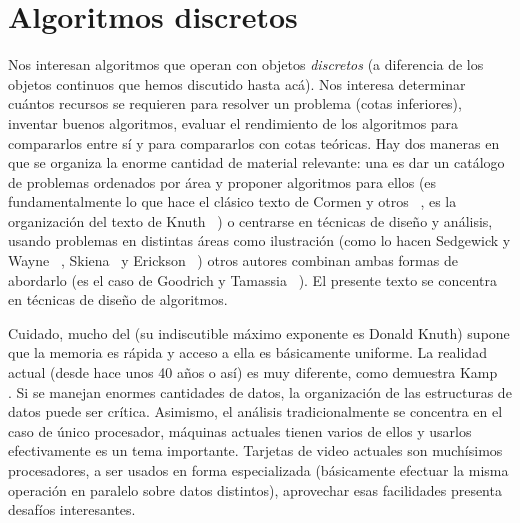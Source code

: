 

\chapter{Algoritmos discretos}
\label{cha:discrete-algorithms}

  Nos interesan algoritmos que operan con objetos \emph{discretos}
  (a diferencia de los objetos continuos que hemos discutido hasta acá).
  Nos interesa determinar cuántos recursos
  se requieren para resolver un problema
  (cotas inferiores),
  inventar buenos algoritmos,
  evaluar el rendimiento de los algoritmos para compararlos entre sí
  y para compararlos con cotas teóricas.
  Hay dos maneras en que se organiza la enorme cantidad de material relevante:
  una es dar un catálogo de problemas ordenados por área
  y proponer algoritmos para ellos
  (es fundamentalmente lo que hace el clásico texto de Cormen y otros~%
     \cite{cormen09:_CLRS},
   es la organización del texto de Knuth~%
     \cite{knuth97:_fundam_algor,
           knuth97:_semin_algor,
           knuth98:_sortin_searc,
           knuth11:_combin_alg_1})
  o centrarse en técnicas de diseño y análisis,
  usando problemas en distintas áreas como ilustración
  (como lo hacen Sedgewick y Wayne~%
     \cite{sedgewick11:_algorithms},
   Skiena~%
     \cite{skiena08:_algor_desig_manual}
   y Erickson~%
     \cite{erickson19:_algorithms})
  otros autores combinan ambas formas de abordarlo
  (es el caso de Goodrich y Tamassia~%
     \cite{goodrich01:_algorithm_design}).
  El presente texto se concentra en técnicas de diseño de algoritmos.

  Cuidado,
  mucho del 
  (su indiscutible máximo exponente es Donald Knuth)
  supone que la memoria es rápida
  y acceso a ella es básicamente uniforme.
  La realidad actual
  (desde hace unos 40 años o así)
  es muy diferente,
  como demuestra Kamp~%
    \cite{kamp10:_doing_it_wrong}.
  Si se manejan enormes cantidades de datos,
  la organización de las estructuras de datos puede ser crítica.
  Asimismo,
  el análisis tradicionalmente se concentra en el caso de único procesador,
  máquinas actuales tienen varios de ellos y usarlos efectivamente
  es un tema importante.
  Tarjetas de video actuales son muchísimos procesadores,
  a ser usados en forma especializada
  (básicamente efectuar la misma operación en paralelo sobre datos distintos),
  aprovechar esas facilidades presenta desafíos interesantes.

